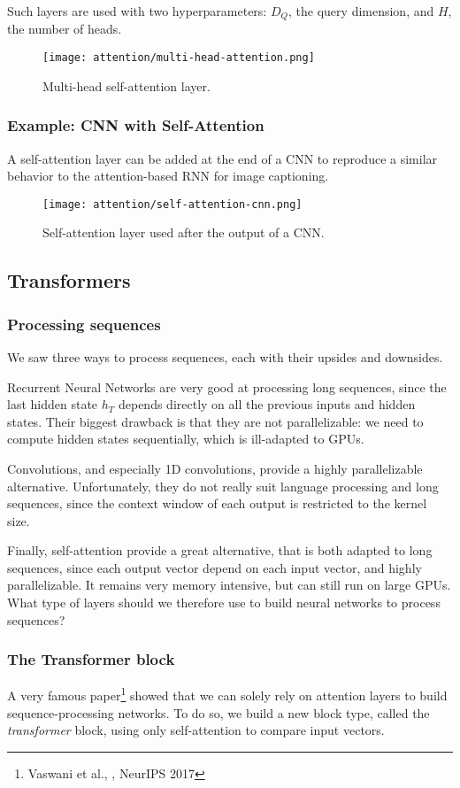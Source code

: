 Such layers are used with two hyperparameters: $D_Q$, the query dimension, and $H$, the number of heads.
\begin{figure}[H]
    \centering
    \texttt{[image: attention/multi-head-attention.png]}
    \caption{Multi-head self-attention layer.}
\end{figure}

\subsubsection{Example: CNN with Self-Attention}
A self-attention layer can be added at the end of a CNN to reproduce a similar behavior to the attention-based RNN for image captioning.
\begin{figure}[H]
    \centering
    \texttt{[image: attention/self-attention-cnn.png]}
    \caption{Self-attention layer used after the output of a CNN.}
\end{figure}

\subsection{Transformers}
\subsubsection{Processing sequences}
We saw three ways to process sequences, each with their upsides and downsides.

Recurrent Neural Networks are very good at processing long sequences, since the last hidden state $h_T$ depends directly on all the previous inputs and hidden states. Their biggest drawback is that they are not parallelizable: we need to compute hidden states sequentially, which is ill-adapted to GPUs. 

Convolutions, and especially 1D convolutions, provide a highly parallelizable alternative. Unfortunately, they do not really suit language processing and long sequences, since the context window of each output is restricted to the kernel size.

Finally, self-attention provide a great alternative, that is both adapted to long sequences, since each output vector depend on each input vector, and highly parallelizable. It remains very memory intensive, but can still run on large GPUs. What type of layers should we therefore use to build neural networks to process sequences?

\subsubsection{The Transformer block}
A very famous paper\footnote{Vaswani et al., , NeurIPS 2017} showed that we can solely rely on attention layers to build sequence-processing networks. To do so, we build a new block type, called the \emph{transformer} block, using only self-attention to compare input vectors.

